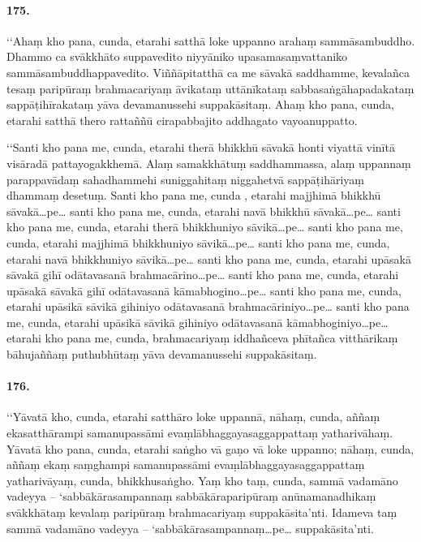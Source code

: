 \paragraph{175.} ‘‘Ahaṃ kho pana, cunda, etarahi satthā loke uppanno arahaṃ sammāsambuddho. Dhammo ca svākkhāto suppavedito niyyāniko upasamasaṃvattaniko sammāsambuddhappavedito. Viññāpitatthā ca me sāvakā saddhamme, kevalañca tesaṃ paripūraṃ brahmacariyaṃ āvikataṃ uttānīkataṃ sabbasaṅgāhapadakataṃ sappāṭihīrakataṃ yāva devamanussehi suppakāsitaṃ. Ahaṃ kho pana, cunda, etarahi satthā thero rattaññū cirapabbajito addhagato vayoanuppatto.

‘‘Santi kho pana me, cunda, etarahi therā bhikkhū sāvakā honti viyattā vinītā visāradā pattayogakkhemā. Alaṃ samakkhātuṃ saddhammassa, alaṃ uppannaṃ parappavādaṃ sahadhammehi suniggahitaṃ niggahetvā sappāṭihāriyaṃ dhammaṃ desetuṃ. Santi kho pana me, cunda , etarahi majjhimā bhikkhū sāvakā…pe… santi kho pana me, cunda, etarahi navā bhikkhū sāvakā…pe… santi kho pana me, cunda, etarahi therā bhikkhuniyo sāvikā…pe… santi kho pana me, cunda, etarahi majjhimā bhikkhuniyo sāvikā…pe… santi kho pana me, cunda, etarahi navā bhikkhuniyo sāvikā…pe… santi kho pana me, cunda, etarahi upāsakā sāvakā gihī odātavasanā brahmacārino…pe… santi kho pana me, cunda, etarahi upāsakā sāvakā gihī odātavasanā kāmabhogino…pe… santi kho pana me, cunda, etarahi upāsikā sāvikā gihiniyo odātavasanā brahmacāriniyo…pe… santi kho pana me, cunda, etarahi upāsikā sāvikā gihiniyo odātavasanā kāmabhoginiyo…pe… etarahi kho pana me, cunda, brahmacariyaṃ iddhañceva phītañca vitthārikaṃ bāhujaññaṃ puthubhūtaṃ yāva devamanussehi suppakāsitaṃ.

\paragraph{176.} ‘‘Yāvatā kho, cunda, etarahi satthāro loke uppannā, nāhaṃ, cunda, aññaṃ ekasatthārampi samanupassāmi evaṃlābhaggayasaggappattaṃ yatharivāhaṃ. Yāvatā kho pana, cunda, etarahi saṅgho vā gaṇo vā loke uppanno; nāhaṃ, cunda, aññaṃ ekaṃ saṃghampi samanupassāmi evaṃlābhaggayasaggappattaṃ yatharivāyaṃ, cunda, bhikkhusaṅgho. Yaṃ kho taṃ, cunda, sammā vadamāno vadeyya – ‘sabbākārasampannaṃ sabbākāraparipūraṃ anūnamanadhikaṃ svākkhātaṃ kevalaṃ paripūraṃ brahmacariyaṃ suppakāsita’nti. Idameva taṃ sammā vadamāno vadeyya – ‘sabbākārasampannaṃ…pe… suppakāsita’nti.

